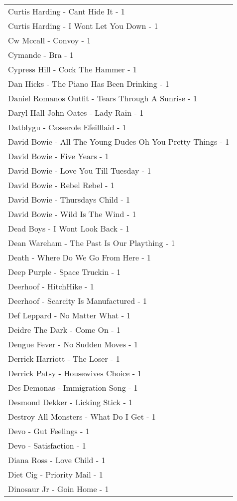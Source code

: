 \documentclass[
]{article}
\begin{document}
\begin{longtable}{l}
Curtis Harding - Cant Hide It - 1 \\ 
Curtis Harding - I Wont Let You Down - 1 \\ 
Cw Mccall - Convoy - 1 \\ 
Cymande - Bra - 1 \\ 
Cypress Hill - Cock The Hammer - 1 \\ 
Dan Hicks - The Piano Has Been Drinking - 1 \\ 
Daniel Romanos Outfit - Tears Through A Sunrise - 1 \\ 
Daryl Hall John Oates - Lady Rain - 1 \\ 
Datblygu - Casserole Efeilllaid - 1 \\ 
David Bowie - All The Young Dudes Oh You Pretty Things - 1 \\ 
David Bowie - Five Years - 1 \\ 
David Bowie - Love You Till Tuesday - 1 \\ 
David Bowie - Rebel Rebel - 1 \\ 
David Bowie - Thursdays Child - 1 \\ 
David Bowie - Wild Is The Wind - 1 \\ 
Dead Boys - I Wont Look Back - 1 \\ 
Dean Wareham - The Past Is Our Plaything - 1 \\ 
Death - Where Do We Go From Here - 1 \\ 
Deep Purple - Space Truckin - 1 \\ 
Deerhoof - HitchHike - 1 \\ 
Deerhoof - Scarcity Is Manufactured - 1 \\ 
Def Leppard - No Matter What - 1 \\ 
Deidre The Dark - Come On - 1 \\ 
Dengue Fever - No Sudden Moves - 1 \\ 
Derrick Harriott - The Loser - 1 \\ 
Derrick Patsy - Housewives Choice - 1 \\ 
Des Demonas - Immigration Song - 1 \\ 
Desmond Dekker - Licking Stick - 1 \\ 
Destroy All Monsters - What Do I Get - 1 \\ 
Devo - Gut Feelings - 1 \\ 
Devo - Satisfaction - 1 \\ 
Diana Ross - Love Child - 1 \\ 
Diet Cig - Priority Mail - 1 \\ 
Dinosaur Jr - Goin Home - 1 \\ 

\end{longtable}
\end{document}
